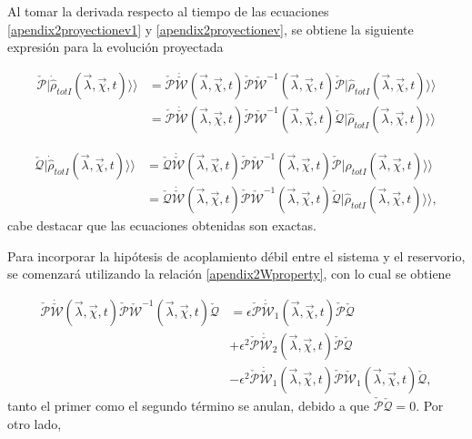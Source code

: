 \begin{appendixs}
Al tomar la derivada respecto al tiempo de las ecuaciones \ref{apendix2proyectionev1} y \ref{apendix2proyectionev}, se obtiene la siguiente expresión para la evolución proyectada

\begin{align*}
    \check{\mathcal{P}}|\dot{\hat{\rho}}_{totI}(\vec{\lambda},\vec{\chi},t) \rangle \rangle & = \check{\mathcal{P}}\dot{\check{\mathcal{W}}}(\vec{\lambda},\vec{\chi},t)\check{\mathcal{P}}\check{\mathcal{W}}^{-1}(\vec{\lambda},\vec{\chi},t)\check{\mathcal{P}}|\hat{\rho}_{totI}(\vec{\lambda},\vec{\chi},t)\rangle \rangle \\
     & = \check{\mathcal{P}}\dot{\check{\mathcal{W}}}(\vec{\lambda},\vec{\chi},t)\check{\mathcal{P}}\check{\mathcal{W}}^{-1}(\vec{\lambda},\vec{\chi},t)\check{\mathcal{Q}}|\hat{\rho}_{totI}(\vec{\lambda},\vec{\chi},t)\rangle \rangle 
\end{align*}

\begin{align*}
    \check{\mathcal{Q}}|\dot{\hat{\rho}}_{totI}(\vec{\lambda},\vec{\chi},t) \rangle \rangle & = \check{\mathcal{Q}}\dot{\check{\mathcal{W}}}(\vec{\lambda},\vec{\chi},t)\check{\mathcal{P}}\check{\mathcal{W}}^{-1}(\vec{\lambda},\vec{\chi},t)\check{\mathcal{P}}|\hat{\rho}_{totI}(\vec{\lambda},\vec{\chi},t)\rangle \rangle \\
     & = \check{\mathcal{Q}}\dot{\check{\mathcal{W}}}(\vec{\lambda},\vec{\chi},t)\check{\mathcal{P}}\check{\mathcal{W}}^{-1}(\vec{\lambda},\vec{\chi},t)\check{\mathcal{Q}}|\hat{\rho}_{totI}(\vec{\lambda},\vec{\chi},t)\rangle \rangle, 
\end{align*}
cabe destacar que las ecuaciones obtenidas son exactas. 

Para incorporar la hipótesis de acoplamiento débil entre el sistema y el reservorio, se comenzará utilizando la relación \ref{apendix2Wproperty}, con lo cual se obtiene

\begin{align*}
    \check{\mathcal{P}}\dot{\check{\mathcal{W}}}(\vec{\lambda},\vec{\chi},t)\check{\mathcal{P}}\check{\mathcal{W}}^{-1}(\vec{\lambda},\vec{\chi},t)\check{\mathcal{Q}} & = \epsilon \check{\mathcal{P}}\dot{\check{\mathcal{W}}}_{1}(\vec{\lambda},\vec{\chi},t) \check{\mathcal{P}}\check{\mathcal{Q}} \\
     & + \epsilon^{2} \check{\mathcal{P}}\dot{\check{\mathcal{W}}}_{2}(\vec{\lambda},\vec{\chi},t) \check{\mathcal{P}}\check{\mathcal{Q}} \\
     & - \epsilon^{2}\check{\mathcal{P}}\dot{\check{\mathcal{W}}}_{1}(\vec{\lambda},\vec{\chi},t)\check{\mathcal{P}} \check{\mathcal{W}}_{1}(\vec{\lambda},\vec{\chi},t)\check{\mathcal{Q}},
\end{align*}
tanto el primer como el segundo término se anulan, debido a que \(\check{\mathcal{P}} \check{\mathcal{Q}} = 0\). Por otro lado, 


\end{appendixs}
